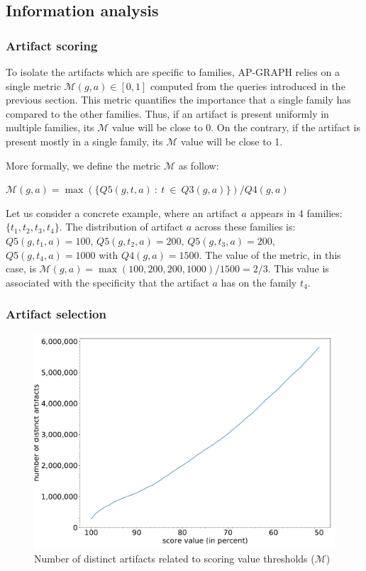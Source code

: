 \subsection{Information analysis}
\subsubsection{Artifact scoring}
To isolate the artifacts which are specific to families, AP-GRAPH relies on a single metric $\mathcal{M}(\mathit{g}, \mathit{a}) \in [0, 1]$ computed from the queries introduced in the previous section.
This metric quantifies the importance that a single family has compared to the other families.
Thus, if an artifact is present uniformly in multiple families, its $\mathcal{M}$ value will be close to 0.
On the contrary, if the artifact is present mostly in a single family, its $\mathcal{M}$ value will be close to 1.

More formally, we define the metric $\mathcal{M}$ as follow:

$\mathcal{M}(\mathit{g}, \mathit{a}) = \max(\{Q5(\mathit{g}, \mathit{t}, \mathit{a})~ :~ t~ \in~ Q3(\mathit{g}, \mathit{a})\}) / Q4(\mathit{g}, \mathit{a})$

Let us consider a concrete example, where an artifact $\mathit{a}$ appears in 4 families: $\{\mathit{t}_1, \mathit{t}_2, \mathit{t}_3, \mathit{t}_4\}$.
The distribution of artifact $\mathit{a}$ across these families is: $Q5(\mathit{g}, \mathit{t}_1, \mathit{a}) = 100$, $Q5(\mathit{g}, \mathit{t}_2, \mathit{a}) = 200$, $Q5(\mathit{g}, \mathit{t}_3, \mathit{a}) = 200$, $Q5(\mathit{g}, \mathit{t}_4, \mathit{a}) = 1000$ with $Q4(\mathit{g}, \mathit{a}) = 1500$.
The value of the metric, in this case, is $\mathcal{M}(\mathit{g}, \mathit{a}) = \max(100, 200, 200, 1000) / 1500 = 2/3$.
This value is associated with the specificity that the artifact $\mathit{a}$ has on the family $\mathit{t}_4$.
\subsubsection{Artifact selection}

\begin{figure}[!ht]
        \centering
	\includegraphics[width=0.8\linewidth]{figures/apgraph/thresholds.pdf}
        \caption[Number of distinct artifacts related to scoring value thresholds]{Number of distinct artifacts related to scoring value thresholds ($\mathcal{M}$)}
	\label{figure:apgraph:thresholds}
\end{figure}

